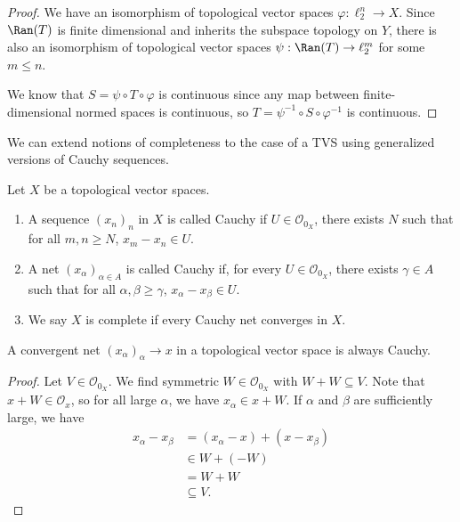 \documentclass[10pt]{mypackage}
\begin{document}
\begin{proof}
  We have an isomorphism of topological vector spaces $\varphi: \ell_{2}^{n}\rightarrow X$. Since $\Ran(T)$ is finite dimensional and inherits the subspace topology on $Y$, there is also an isomorphism of topological vector spaces $\psi: \Ran(T) \rightarrow \ell_{2}^{m}$ for some $m\leq n$.\newline

  We know that $S = \psi\circ T \circ \varphi$ is continuous since any map between finite-dimensional normed spaces is continuous, so $T = \psi^{-1}\circ S \circ \varphi^{-1}$ is continuous.
\end{proof}
We can extend notions of completeness to the case of a TVS using generalized versions of Cauchy sequences.
\begin{definition}
  Let $X$ be a topological vector spaces.
\begin{enumerate}[(1)]
  \item A sequence $\left(x_n\right)_n$ in $X$ is called Cauchy if $U\in \mathcal{O}_{0_X}$, there exists $N$ such that for all $m,n\geq N$, $x_m - x_n\in U$.
  \item A net $\left(x_{\alpha}\right)_{\alpha \in A}$ is called Cauchy if, for every $U\in \mathcal{O}_{0_X}$, there exists $\gamma\in A$ such that for all $\alpha,\beta \geq \gamma$, $x_{\alpha} - x_{\beta}\in U$.
  \item We say $X$ is complete if every Cauchy net converges in $X$.
\end{enumerate}
\end{definition}
\begin{proposition}
  A convergent net $\left(x_{\alpha}\right)_{\alpha}\rightarrow x$ in a topological vector space is always Cauchy.
\end{proposition}
\begin{proof}
  Let $V\in \mathcal{O}_{0_X}$. We find symmetric $W\in \mathcal{O}_{0_X}$ with $W+W \subseteq V$. Note that $x + W\in \mathcal{O}_{x}$, so for all large $\alpha$, we have $x_{\alpha}\in x + W$. If $\alpha$ and $\beta$ are sufficiently large, we have
  \begin{align*}
    x_{\alpha} - x_{\beta} &= \left(x_{\alpha} - x\right) + \left(x-x_{\beta}\right)\\
                           &\in W + \left(-W\right)\\
                           &= W + W\\
                           &\subseteq V.
  \end{align*}
\end{proof}
\end{document}
